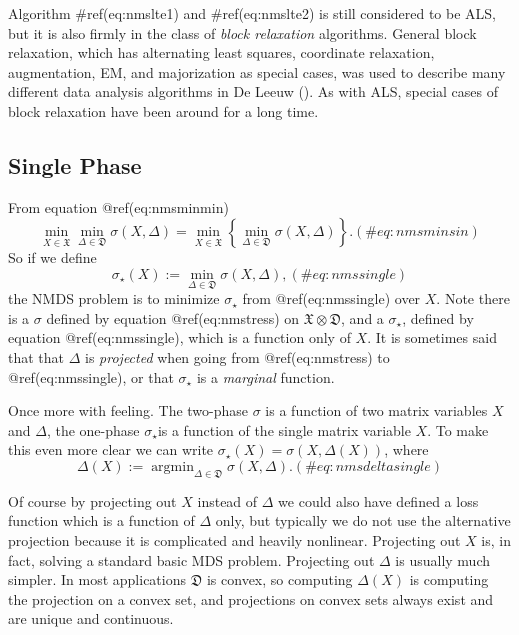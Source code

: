 \documentclass[
  12pt,
  letterpaper,
  DIV=11,
  numbers=noendperiod]{scrreprt}
\theoremstyle{remark}
\begin{document}
Algorithm \#ref(eq:nmslte1) and \#ref(eq:nmslte2) is still considered to
be ALS, but it is also firmly in the class of \emph{block relaxation}
algorithms. General block relaxation, which has alternating least
squares, coordinate relaxation, augmentation, EM, and majorization as
special cases, was used to describe many different data analysis
algorithms in De Leeuw (). As with
ALS, special cases of block relaxation have been around for a long time.

\subsection{Single Phase}\label{nmssinglephase}

From equation @ref(eq:nmsminmin) \begin{equation}
\min_{X\in\mathfrak{X}}\min_{\Delta\in\mathfrak{D}}\sigma(X,\Delta)=\min_{X\in\mathfrak{X}}\left\{\min_{\Delta\in\mathfrak{D}}\sigma(X,\Delta)\right\}.
(\#eq:nmsminsin)
\end{equation} So if we define \begin{equation}
\sigma_\star(X):=\min_{\Delta\in\mathfrak{D}}\sigma(X,\Delta),
(\#eq:nmssingle)
\end{equation} the NMDS problem is to minimize \(\sigma_\star\) from
@ref(eq:nmssingle) over \(X\). Note there is a \(\sigma\) defined by
equation @ref(eq:nmstress) on \(\mathfrak{X}\otimes\mathfrak{D}\), and a
\(\sigma_\star\), defined by equation @ref(eq:nmssingle), which is a
function only of \(X\). It is sometimes said that that \(\Delta\) is
\emph{projected} when going from @ref(eq:nmstress) to
@ref(eq:nmssingle), or that \(\sigma_\star\) is a \emph{marginal}
function.

Once more with feeling. The two-phase \(\sigma\) is a function of two
matrix variables \(X\) and \(\Delta\), the one-phase \(\sigma_\star\)is
a function of the single matrix variable \(X\). To make this even more
clear we can write \(\sigma_\star(X)=\sigma(X,\Delta(X))\), where
\begin{equation}
\Delta(X):=\mathop{\text{argmin}}_{\Delta\in\mathfrak{D}}\sigma(X,\Delta).
(\#eq:nmsdeltasingle)
\end{equation}

Of course by projecting out \(X\) instead of \(\Delta\) we could also
have defined a loss function which is a function of \(\Delta\) only, but
typically we do not use the alternative projection because it is
complicated and heavily nonlinear. Projecting out \(X\) is, in fact,
solving a standard basic MDS problem. Projecting out \(\Delta\) is
usually much simpler. In most applications \(\mathfrak{D}\) is convex,
so computing \(\Delta(X)\) is computing the projection on a convex set,
and projections on convex sets always exist and are unique and
continuous.
\end{document}
